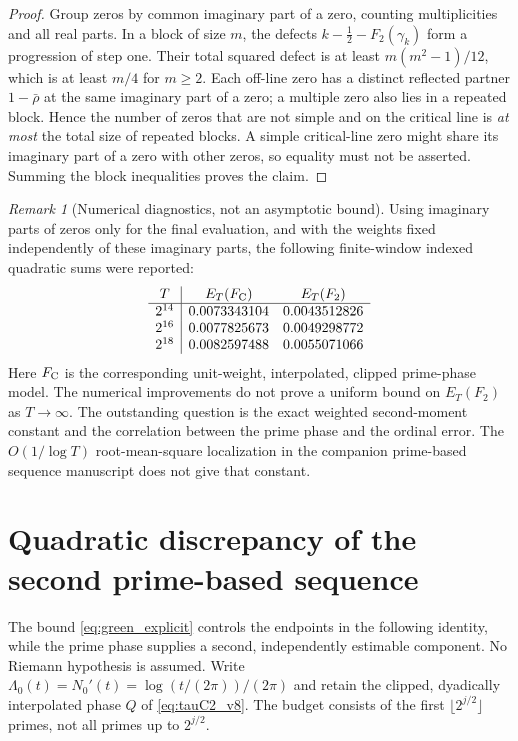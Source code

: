 \documentclass[11pt,reqno]{amsart}
\numberwithin{equation}{section}
\theoremstyle{definition}
\theoremstyle{remark}
\newtheorem{remark}[theorem]{Remark}
\begin{document}
\begin{proof}
Group zeros by common imaginary part of a zero, counting multiplicities
and all real parts. In a block of size $m$, the defects
$k-\frac12-F_2(\gamma_k)$ form a progression of step one.
Their total squared defect is at least $m(m^2-1)/12$,
which is at least $m/4$ for $m\ge2$.
Each off-line zero has a distinct reflected partner
$1-\bar\rho$ at the same imaginary part of a zero; a multiple zero
also lies in a repeated block. Hence the number of zeros
that are not simple and on the critical line is \emph{at
most} the total size of repeated blocks.
A simple critical-line zero might share its imaginary part of a zero
with other zeros, so equality must not be asserted.
Summing the block inequalities proves the claim.
\end{proof}

\begin{remark}[Numerical diagnostics, not an asymptotic bound]
\label{rem:tauC2_data_v8}
Using imaginary parts of zeros only for the final evaluation, and with
the weights fixed independently of these imaginary parts,
the following finite-window indexed quadratic sums were reported:
\[
\begin{array}{c|cc}
T&E_T(F_{\rm C})&E_T(F_2)\\\hline
2^{14}&0.0073343104&0.0043512826\\
2^{16}&0.0077825673&0.0049298772\\
2^{18}&0.0082597488&0.0055071066
\end{array}
\]
Here $F_{\rm C}$ is the corresponding unit-weight,
interpolated, clipped prime-phase model.
The numerical improvements do not prove a uniform
bound on $E_T(F_2)$ as $T\to\infty$.
The outstanding question is the exact weighted
second-moment constant and the correlation between
the prime phase and the ordinal error.
The $O(1/\log T)$ root-mean-square localization
in the companion prime-based sequence manuscript does not
give that constant.
\end{remark}


\section{Quadratic discrepancy of the second prime-based sequence}\label{sec:tauC2_quadratic_sum_v8}
The bound \eqref{eq:green_explicit} controls the endpoints in the
following identity, while the prime phase supplies a second,
independently estimable component. No Riemann hypothesis is assumed.
Write $\Lambda_0(t)=N_0'(t)=\log(t/(2\pi))/(2\pi)$ and retain
the clipped, dyadically interpolated phase $Q$ of
\eqref{eq:tauC2_v8}. The budget consists of the first
$\lfloor2^{j/2}\rfloor$ primes, not all primes up to $2^{j/2}$.
\end{document}
